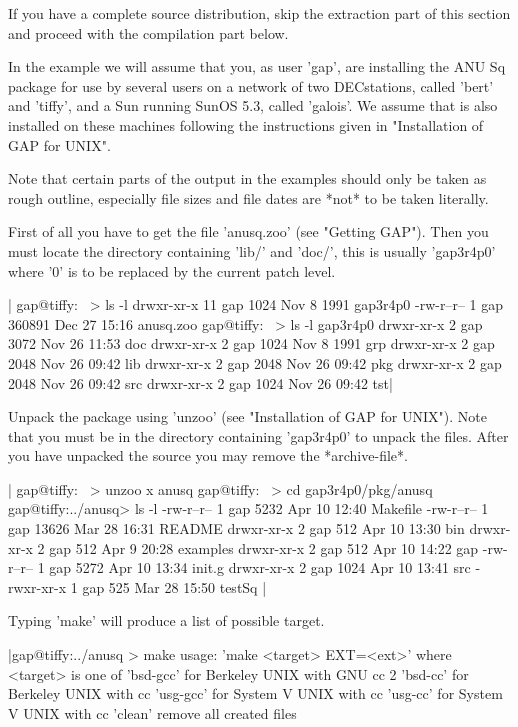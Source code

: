 If you have a complete source distribution,  skip the  extraction part of
this section and proceed with the compilation part below.

In the example we will assume that you, as user 'gap', are installing the
ANU Sq package for use by several users  on a network of two DECstations,
called   'bert' and  'tiffy',   and a  Sun   running  SunOS  5.3,  called
'galois'. We  assume  that {\GAP}  is also   installed on these  machines
following the instructions given in "Installation of GAP for UNIX".

Note that certain parts  of  the  output  in the examples should  only be
taken as rough outline, especially file sizes and file dates are *not* to
be taken literally.

First of  all you have to  get the file  'anusq.zoo' (see "Getting GAP").
Then you  must locate the {\GAP} directory  containing 'lib/' and 'doc/',
this is usually  'gap3r4p0' where '0'  is to be  replaced by  the current
patch level.

|    gap@tiffy:~ > ls -l
    drwxr-xr-x  11 gap     1024 Nov  8  1991 gap3r4p0
    -rw-r--r--   1 gap   360891 Dec 27 15:16 anusq.zoo
    gap@tiffy:~ > ls -l gap3r4p0
    drwxr-xr-x   2 gap     3072 Nov 26 11:53 doc
    drwxr-xr-x   2 gap     1024 Nov  8  1991 grp
    drwxr-xr-x   2 gap     2048 Nov 26 09:42 lib
    drwxr-xr-x   2 gap     2048 Nov 26 09:42 pkg
    drwxr-xr-x   2 gap     2048 Nov 26 09:42 src
    drwxr-xr-x   2 gap     1024 Nov 26 09:42 tst|

Unpack the package using 'unzoo'  (see "Installation  of GAP for  UNIX").
Note that  you must be in the  directory containing 'gap3r4p0'  to unpack
the files.    After you have  unpacked   the source  you may  remove  the
*archive-file*.

|    gap@tiffy:~ > unzoo x anusq
    gap@tiffy:~ > cd gap3r4p0/pkg/anusq
    gap@tiffy:../anusq> ls -l
    -rw-r--r--   1 gap     5232 Apr 10 12:40 Makefile
    -rw-r--r--   1 gap    13626 Mar 28 16:31 README
    drwxr-xr-x   2 gap      512 Apr 10 13:30 bin
    drwxr-xr-x   2 gap      512 Apr  9 20:28 examples
    drwxr-xr-x   2 gap      512 Apr 10 14:22 gap
    -rw-r--r--   1 gap     5272 Apr 10 13:34 init.g
    drwxr-xr-x   2 gap     1024 Apr 10 13:41 src
    -rwxr-xr-x   1 gap      525 Mar 28 15:50 testSq |

Typing 'make' will produce a list of possible target.

|gap@tiffy:../anusq > make
usage: 'make <target> EXT=<ext>'  where <target> is one of
'bsd-gcc'    for Berkeley UNIX with GNU cc 2
'bsd-cc'     for Berkeley UNIX with cc
'usg-gcc'    for System V UNIX with cc
'usg-cc'     for System V UNIX with cc
'clean'      remove all created files

